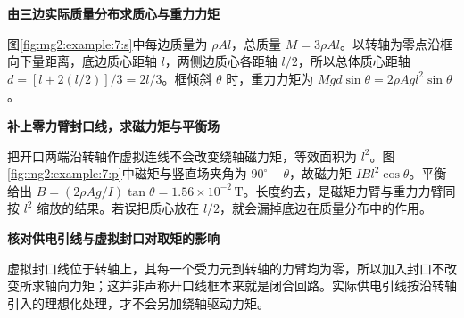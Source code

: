 \begin{solution}\textbf{由三边实际质量分布求质心与重力力矩}\par\nobreak
图\ref{fig:mg2:example:7:s}中每边质量为 $\rho Al$，总质量 $M=3\rho Al$。以转轴为零点沿框向下量距离，底边质心距轴 $l$，两侧边质心各距轴 $l/2$，所以总体质心距轴 $d=[l+2(l/2)]/3=2l/3$。框倾斜 $\theta$ 时，重力力矩为 $Mg d\sin\theta=2\rho Agl^2\sin\theta$。



\par\medskip{}\noindent\textbf{补上零力臂封口线，求磁力矩与平衡场}\par\nobreak
把开口两端沿转轴作虚拟连线不会改变绕轴磁力矩，等效面积为 $l^2$。图\ref{fig:mg2:example:7:p}中磁矩与竖直场夹角为 $90^\circ-\theta$，故磁力矩 $IBl^2\cos\theta$。平衡给出 $B=(2\rho Ag/I)\tan\theta=1.56\times10^{-2}\,\mathrm T$。长度约去，是磁矩力臂与重力力臂同按 $l^2$ 缩放的结果。若误把质心放在 $l/2$，就会漏掉底边在质量分布中的作用。



\par\medskip{}\noindent\textbf{核对供电引线与虚拟封口对取矩的影响}\par\nobreak
虚拟封口线位于转轴上，其每一个受力元到转轴的力臂均为零，所以加入封口不改变所求轴向力矩；这并非声称开口线框本来就是闭合回路。实际供电引线按沿转轴引入的理想化处理，才不会另加绕轴驱动力矩。\end{solution}
